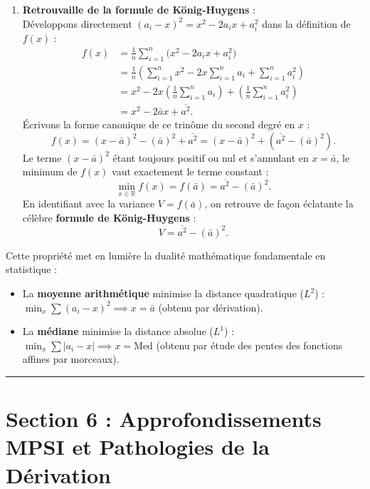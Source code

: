 \documentclass[11pt,a4paper]{article}
\newcommand{\R}{\mathbb{R}}
\begin{document}
\begin{correctionbox}
\begin{enumerate}[label=\textbf{\arabic*.}]
    \item \textbf{Retrouvaille de la formule de König-Huygens} :\\
    Développons directement $(a_i - x)^2 = x^2 - 2a_i x + a_i^2$ dans la définition de $f(x)$ :
    \begin{align*}
    f(x) &= \frac{1}{n} \sum_{i=1}^n \big( x^2 - 2a_i x + a_i^2 \big) \\
    &= \frac{1}{n}\left( \sum_{i=1}^n x^2 - 2x \sum_{i=1}^n a_i + \sum_{i=1}^n a_i^2 \right) \\
    &= x^2 - 2x \left(\frac{1}{n}\sum_{i=1}^n a_i\right) + \left(\frac{1}{n}\sum_{i=1}^n a_i^2\right) \\
    &= x^2 - 2\bar{a}x + \overline{a^2}.
    \end{align*}
    Écrivons la forme canonique de ce trinôme du second degré en $x$ :
    \[
    f(x) = (x - \bar{a})^2 - (\bar{a})^2 + \overline{a^2} = (x - \bar{a})^2 + \left( \overline{a^2} - (\bar{a})^2 \right).
    \]
    Le terme $(x - \bar{a})^2$ étant toujours positif ou nul et s'annulant en $x = \bar{a}$, le minimum de $f(x)$ vaut exactement le terme constant :
    \[
    \min_{x \in \R} f(x) = f(\bar{a}) = \overline{a^2} - (\bar{a})^2.
    \]
    En identifiant avec la variance $V = f(\bar{a})$, on retrouve de façon éclatante la célèbre \textbf{formule de König-Huygens} :
    \[
    V = \overline{a^2} - (\bar{a})^2.
    \]
\end{enumerate}
\end{correctionbox}

\begin{remarquabox}
Cette propriété met en lumière la dualité mathématique fondamentale en statistique :
\begin{itemize}
    \item La \textbf{moyenne arithmétique} minimise la distance quadratique ($L^2$) : $\min_x \sum (a_i - x)^2 \implies x = \bar{a}$ (obtenu par dérivation).
    \item La \textbf{médiane} minimise la distance absolue ($L^1$) : $\min_x \sum |a_i - x| \implies x = \text{Med}$ (obtenu par étude des pentes des fonctions affines par morceaux).
\end{itemize}
\end{remarquabox}


\vspace{1cm}
\hrule
\vspace{1cm}
\section{Section 6 : Approfondissements MPSI et Pathologies de la Dérivation}
\end{document}
